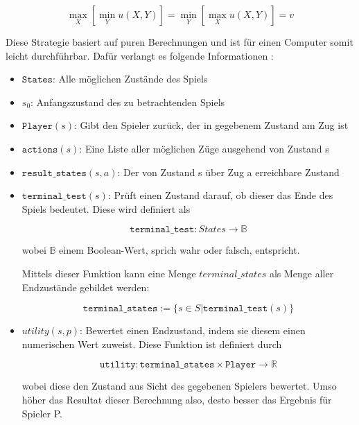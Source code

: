 \begin{equation}
\max\limits_X[\min\limits_Yu(X,Y)] = \min\limits_Y[\max\limits_Xu(X,Y)] = v
\end{equation}

Diese Strategie basiert auf puren Berechnungen und ist für einen Computer somit leicht durchführbar. Dafür verlangt es folgende Informationen \cite{Stroetmann2018}:

\begin{itemize}
\item \textbf{$\mathtt{States}$}: Alle möglichen Zustände des Spiels
\item \textbf{$s_0$}: Anfangszustand des zu betrachtenden Spiels
\item \textbf{$\mathtt{Player}(s)$}: Gibt den Spieler zurück, der in gegebenem Zustand am Zug ist
\item \textbf{$\mathtt{actions}(s)$}: Eine Liste aller möglichen Züge ausgehend von Zustand s
\item \textbf{$\mathtt{result\_states}(s,a)$}: Der von Zustand s über Zug a erreichbare Zustand
\item \textbf{$\mathtt{terminal\_test}(s)$}: Prüft einen Zustand darauf, ob dieser das Ende des Spiels bedeutet. Diese wird definiert als

\begin{equation}
\mathtt{terminal\_test} : States \rightarrow \mathbb{B}
\end{equation}

wobei $\mathbb{B}$ einem Boolean-Wert, sprich wahr oder falsch, entspricht.

Mittels dieser Funktion kann eine Menge $terminal\_states$ als Menge aller Endzustände gebildet werden:

\begin{equation}
\mathtt{terminal\_states} := \{s \in S | \mathtt{terminal\_test}(s)\}
\end{equation}

\item \textbf{$utility(s, p)$}: Bewertet einen Endzustand, indem sie diesem einen numerischen Wert zuweist. Diese Funktion ist definiert durch

\begin{equation}
\mathtt{utility} : \mathtt{terminal\_states} \times \mathtt{Player} \rightarrow \mathbb{R}
\end{equation}

wobei diese den Zustand aus Sicht des gegebenen Spielers bewertet. Umso höher das Resultat dieser Berechnung also, desto besser das Ergebnis für Spieler P.
\end{itemize}

